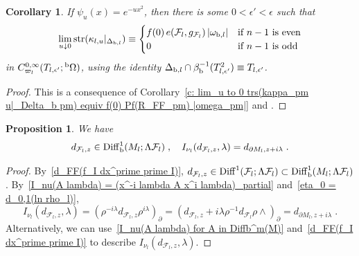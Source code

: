 \documentclass{memo-l}
\theoremstyle{plain}
\newtheorem{cor}[thm]{Corollary}
\newtheorem{prop}[thm]{Proposition}
\theoremstyle{definition}
\theoremstyle{remark}
\newcommand{\FF}{\mathcal{F}}
\newcommand{\Diff}{\operatorname{Diff}}
\newcommand{\str}{\operatorname{str}}
\newcommand{\bOmega}{{}^{\text{\rm b}}\Omega}
\newcommand{\Diffb}{\Diff_{\text{\rm b}}}
\numberwithin{section}{chapter}
\numberwithin{equation}{section}%
\begin{document}
\begin{cor}\label{c: lim_u to 0 trs(kappa_l u|_Deltab) equiv f(0) Pf(R_FF_l) |omega_l|}
If $\psi_u(x)=e^{-ux^2}$, then there is some $0<\epsilon'<\epsilon$ such that
\[
\lim_{u\downarrow0}\str(\kappa_{l,u}|_{\Delta_{\text{\rm b},l}})\equiv
\begin{cases}
f(0)\,e(\FF_l,g_{\FF_l})\,|\omega_{\text{\rm b},l}| & \text{if $n-1$ is even}\\
0 & \text{if $n-1$ is odd}
\end{cases}
\]
in $C^{0,\infty}_{\varpi_l}(T_{l,\epsilon'};\bOmega)$, using the identity $\Delta_{\text{\rm b},l}\cap\beta_{\text{\rm b}}^{-1}(T_{l,\epsilon'}^2)\equiv T_{l,\epsilon'}$.
\end{cor}

\begin{proof}
This is a consequence of Corollary~\ref{c: lim_u to 0 trs(kappa_pm u|_Delta_b pm) equiv f(0) Pf(R_FF_pm) |omega_pm|} and .
\end{proof}

\begin{prop}\label{p: d_FF_l z in Psi_b^c} 
We have
\[
d_{\FF_l,z}\in\Diffb^1(M_l;\Lambda\FF_l)\;,\quad I_{\nu_l}(d_{\FF_l,z},\lambda)=d_{\partial M_l,z+i\lambda}\;.
\]
\end{prop}

\begin{proof}
By~\eqref{d_FF(f_I dx^prime prime I)}, $d_{\FF_l,z}\in\Diff^1(\FF_l;\Lambda\FF_l)\subset\Diffb^1(M_l;\Lambda\FF_l)$. By~\eqref{I_nu(A lambda) = (x^-i lambda A x^i lambda)_partial} and~\eqref{eta_0 = d_0,1(ln rho_l)},
\[
I_{\nu_l}(d_{\FF_l,z},\lambda)=(\rho^{-i\lambda}d_{\FF_l,z}\rho^{i\lambda})_\partial
=(d_{\FF_l,z}+i\lambda\rho^{-1}d_{\FF_l}\rho\wedge)_\partial=d_{\partial M_l,z+i\lambda}\;.
\]
Alternatively, we can use~\eqref{I_nu(A lambda) for A in Diffb^m(M)} and~\eqref{d_FF(f_I dx^prime prime I)} to describe $I_{\nu_l}(d_{\FF_l,z},\lambda)$.
\end{proof}
\end{document}
